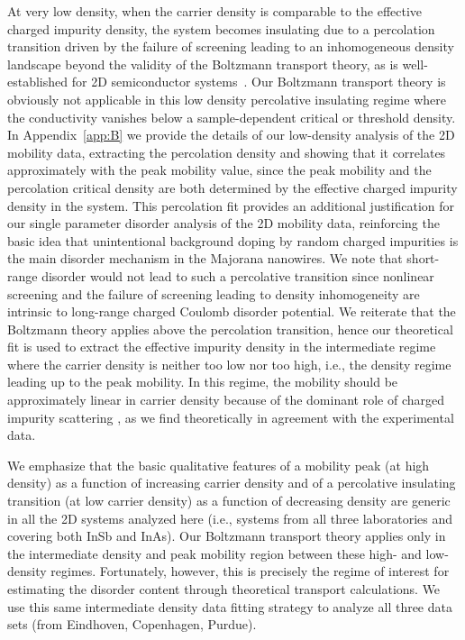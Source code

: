 \documentclass[aps,prmaterials,twocolumn,superscriptaddress,longbibliography]{revtex4-2}
\begin{document}
At very low density, when the carrier density is comparable to the effective charged impurity density, the system becomes insulating due to a percolation transition driven by the failure of screening leading to an inhomogeneous density landscape beyond the validity of the Boltzmann transport theory, as is well-established for 2D semiconductor systems~\cite{dassarma2013twodimensional,pudalov2020experimental,li2019evidence,manfra2007transport,lilly2003resistivity,dassarma2005twodimensional,tracy2009observation,leturcq2003resistance,tracy2006surface,wilamowski2001screening,he1998new,ilani2001microscopic,dassarma2014twodimensional,meir1999percolationtype,knap2014transport,shabani2014apparent}.  Our Boltzmann transport theory is obviously not applicable in this low density percolative insulating regime where the conductivity vanishes below a sample-dependent critical or threshold density. In Appendix~\ref{app:B} we provide the details of our low-density analysis of the 2D mobility data, extracting the percolation density and showing that it correlates approximately with the peak mobility value, since the peak mobility and the percolation critical density are both determined by the effective charged impurity density in the system.  This percolation fit provides an additional justification for our single parameter disorder analysis of the 2D mobility data, reinforcing the basic idea that unintentional background doping by random charged impurities is the main disorder mechanism in the Majorana nanowires.  We note that short-range disorder would not lead to such a percolative transition since nonlinear screening and the failure of screening leading to density inhomogeneity are intrinsic to long-range charged Coulomb disorder potential.  We reiterate that the Boltzmann theory applies above the percolation transition, hence our theoretical fit is used to extract the effective impurity density in the intermediate regime where the carrier density is neither too low nor too high, i.e., the density regime leading up to the peak mobility.  In this regime, the mobility should be approximately linear in carrier density because of the dominant role of charged impurity scattering \cite{dassarma2013universal}, as we find theoretically in agreement with the experimental data.  

We emphasize that the basic qualitative features of a mobility peak (at high density) as a function of increasing carrier density and of a percolative insulating transition (at low carrier density) as a function of decreasing density are generic in all the 2D systems analyzed here (i.e., systems from all three laboratories and covering both InSb and InAs).  Our Boltzmann transport theory applies only in the intermediate density and peak mobility region between these high- and low-density regimes. Fortunately, however, this is precisely the regime of interest for estimating the disorder content through theoretical transport calculations.  We use this same intermediate density data fitting strategy to analyze all three data sets (from Eindhoven, Copenhagen, Purdue).    
  
\end{document}
